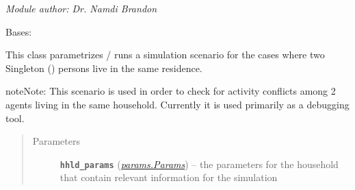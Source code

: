 \documentclass[letterpaper,10pt,english]{sphinxmanual}
\begin{document}
\emph{Module author: Dr. Namdi Brandon}

\begin{fulllineitems}
\label{scenario:scenario.Duo}
Bases: {\hyperref[scenario:scenario.Scenario]{\emph{}}}

This class parametrizes / runs a simulation scenario for the cases where two Singleton     ({\hyperref[singleton:singleton.Singleton]{\emph{}}}) persons live in the same residence.

\begin{notice}{note}{Note:}
This scenario is used in order to check for activity conflicts among 2 agents living in         the same household. Currently it is used primarily as a debugging tool.
\end{notice}
\begin{quote}\begin{description}
\item[{Parameters}] \leavevmode
\textbf{\texttt{hhld\_params}} ({\hyperref[params:params.Params]{\emph{\emph{params.Params}}}}) -- the parameters for the household that contain relevant information     for the simulation

\end{description}\end{quote}

\end{fulllineitems}

\end{document}
